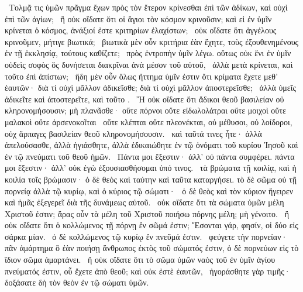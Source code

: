 ~Τολμᾷ τις ὑμῶν πρᾶγμα ἔχων πρὸς τὸν ἕτερον κρίνεσθαι ἐπὶ τῶν ἀδίκων, καὶ οὐχὶ ἐπὶ τῶν ἁγίων;
~ἢ οὐκ οἴδατε ὅτι οἱ ἅγιοι τὸν κόσμον κρινοῦσιν; καὶ εἰ ἐν ὑμῖν κρίνεται ὁ κόσμος, ἀνάξιοί ἐστε κριτηρίων ἐλαχίστων;
~οὐκ οἴδατε ὅτι ἀγγέλους κρινοῦμεν, μήτιγε βιωτικά;
~βιωτικὰ μὲν οὖν κριτήρια ἐὰν ἔχητε, τοὺς ἐξουθενημένους ἐν τῇ ἐκκλησίᾳ, τούτους καθίζετε;
~πρὸς ἐντροπὴν ὑμῖν λέγω. οὕτως οὐκ ἔνι ἐν ὑμῖν οὐδεὶς σοφὸς ὃς δυνήσεται διακρῖναι ἀνὰ μέσον τοῦ  αὐτοῦ,
~ἀλλὰ  μετὰ  κρίνεται, καὶ τοῦτο ἐπὶ ἀπίστων;
~ἤδη μὲν οὖν ὅλως ἥττημα ὑμῖν ἐστιν ὅτι κρίματα ἔχετε μεθ’ ἑαυτῶν· διὰ τί οὐχὶ μᾶλλον ἀδικεῖσθε; διὰ τί οὐχὶ μᾶλλον ἀποστερεῖσθε;
~ἀλλὰ ὑμεῖς ἀδικεῖτε καὶ ἀποστερεῖτε, καὶ τοῦτο .
~Ἢ οὐκ οἴδατε ὅτι ἄδικοι θεοῦ βασιλείαν οὐ κληρονομήσουσιν; μὴ πλανᾶσθε· οὔτε πόρνοι οὔτε εἰδωλολάτραι οὔτε μοιχοὶ οὔτε μαλακοὶ οὔτε ἀρσενοκοῖται
~οὔτε κλέπται οὔτε πλεονέκται, οὐ μέθυσοι, οὐ λοίδοροι, οὐχ ἅρπαγες βασιλείαν θεοῦ κληρονομήσουσιν.
~καὶ ταῦτά τινες ἦτε· ἀλλὰ ἀπελούσασθε, ἀλλὰ ἡγιάσθητε, ἀλλὰ ἐδικαιώθητε ἐν τῷ ὀνόματι τοῦ κυρίου Ἰησοῦ καὶ ἐν τῷ πνεύματι τοῦ θεοῦ ἡμῶν.
~Πάντα μοι ἔξεστιν· ἀλλ’ οὐ πάντα συμφέρει. πάντα μοι ἔξεστιν· ἀλλ’ οὐκ ἐγὼ ἐξουσιασθήσομαι ὑπό τινος.
~τὰ βρώματα τῇ κοιλίᾳ, καὶ ἡ κοιλία τοῖς βρώμασιν· ὁ δὲ θεὸς καὶ ταύτην καὶ ταῦτα καταργήσει. τὸ δὲ σῶμα οὐ τῇ πορνείᾳ ἀλλὰ τῷ κυρίῳ, καὶ ὁ κύριος τῷ σώματι·
~ὁ δὲ θεὸς καὶ τὸν κύριον ἤγειρεν καὶ ἡμᾶς ἐξεγερεῖ διὰ τῆς δυνάμεως αὐτοῦ.
~οὐκ οἴδατε ὅτι τὰ σώματα ὑμῶν μέλη Χριστοῦ ἐστιν; ἄρας οὖν τὰ μέλη τοῦ Χριστοῦ ποιήσω πόρνης μέλη; μὴ γένοιτο.
~ἢ οὐκ οἴδατε ὅτι ὁ κολλώμενος τῇ πόρνῃ ἓν σῶμά ἐστιν; Ἔσονται γάρ, φησίν, οἱ δύο εἰς σάρκα μίαν.
~ὁ δὲ κολλώμενος τῷ κυρίῳ ἓν πνεῦμά ἐστιν.
~φεύγετε τὴν πορνείαν· πᾶν ἁμάρτημα ὃ ἐὰν ποιήσῃ ἄνθρωπος ἐκτὸς τοῦ σώματός ἐστιν, ὁ δὲ πορνεύων εἰς τὸ ἴδιον σῶμα ἁμαρτάνει.
~ἢ οὐκ οἴδατε ὅτι τὸ σῶμα ὑμῶν ναὸς τοῦ ἐν ὑμῖν ἁγίου πνεύματός ἐστιν, οὗ ἔχετε ἀπὸ θεοῦ; καὶ οὐκ ἐστὲ ἑαυτῶν,
~ἠγοράσθητε γὰρ τιμῆς· δοξάσατε δὴ τὸν θεὸν ἐν τῷ σώματι ὑμῶν.

